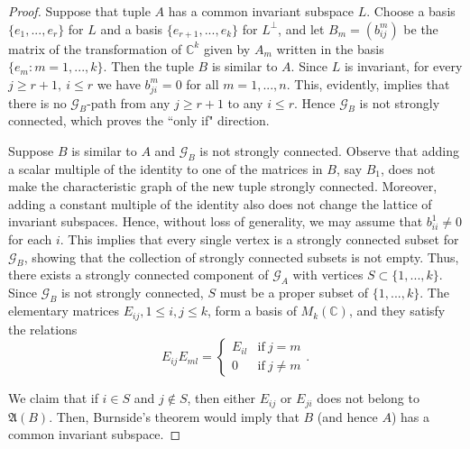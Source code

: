 \documentclass[draft, 12pt, reqno]{amsart}
\newcommand{\C}{{\mathbb C}}
\numberwithin{equation}{section}
\theoremstyle{plain}
\begin{document}
\begin{proof}
Suppose that tuple $A$ has a common invariant subspace $L$. Choose a basis $\{ e_1,...,e_r\}$  for $L$ and a basis $\{e_{r+1},...,e_k\}$ for $L^\perp$, and let $B_m=(b^m_{ij})$ be the matrix of the transformation of $\C^k$ given by $A_m$ written in the basis $\{e_m: m=1,...,k\}$. Then the tuple $B$ is similar to $A$. Since  $L$ is invariant, for every $j\geq r+1, \ i\leq r$ we have $b_{ji}^m=0$ for all $m=1,...,n$. This, evidently, implies that there is no $\mathcal{G}_B$-path from any $j\geq r+1$ to any $i\leq r$. Hence $\mathcal{G}_B$ is not strongly connected, which proves the ``only if" direction.

Suppose $B$ is similar to $A$ and $\mathcal{G}_B$ is not strongly connected. Observe that adding a scalar multiple of the identity to one of the matrices in $B$, say $B_1$, does not make  the characteristic graph of the new tuple strongly connected. Moreover, adding a constant multiple of the identity also does not change the lattice of invariant subspaces. Hence, without loss of generality, we may assume that $b_{ii}^1\neq 0$ for each $i$. This implies that every single vertex is a strongly connected subset for $\mathcal{G}_B$, showing that the collection of strongly connected subsets is not empty. Thus, there exists a strongly connected component of $\mathcal{G}_A$ with vertices $S\subset \{1,...,k\}$. Since $\mathcal{G}_B$ is not strongly connected, $S$ must be a proper subset of $\{1,...,k\}$.  The elementary matrices $E_{ij}, 1\leq i, j\leq k$, form a basis of $M_k(\C)$, and they satisfy the relations
$$E_{ij}E_{ml}= \left\{ \begin{array}{cc} E_{il} & \mbox{if} \ j=m \\ 0 & \mbox{if} \ j\neq m \end{array}  \right. . $$

We claim that if $i\in S$ and $j\notin S$, then either $E_{ij}$ or $E_{ji}$ does not belong to $\mathfrak{A}(B)$. Then, Burnside's theorem would imply that $B$ (and hence $A$) has a common invariant subspace.


\end{proof}
\end{document}

